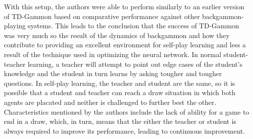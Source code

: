 With this setup,
the authors were able to perform similarly to an earlier version of TD-Gammon
based on comparative performance against other backgammon-playing systems.
%
This leads to the conclusion that the success of TD-Gammon was very much so
the result of the dynamics of backgammon and how they contribute to providing an
excellent environment for self-play learning
and less a result of the technique used in optimizing the neural network.
%
In normal student-teacher learning,
a teacher will attempt to point out edge cases of the student's knowledge
and the student in turn learns by asking tougher and tougher questions.
%
In self-play learning,
the teacher and student are the same,
so it is possible that a student and teacher can reach a draw situation in which
both agents are placated and neither is challenged to further best the other.
%
Characteristics mentioned by the authors include the lack of ability for a game
to end in a draw, which, in turn, means that the either the teacher or student is
always required to improve its performance,
leading to continuous improvement.

